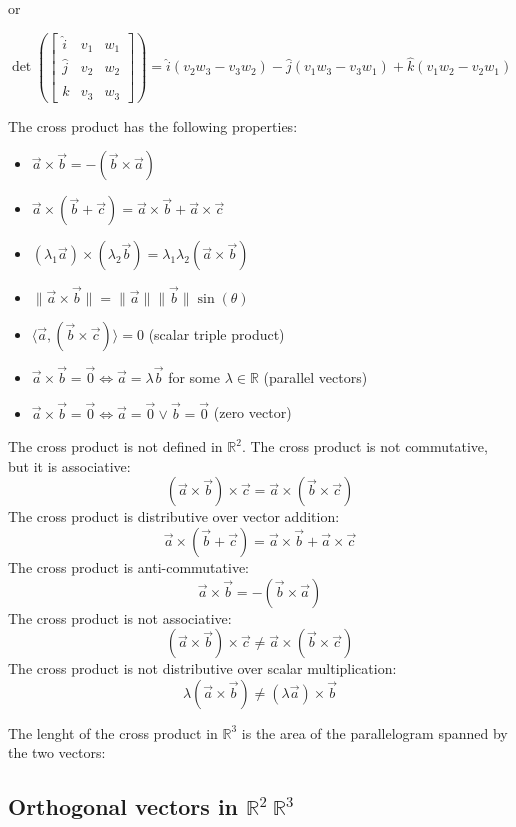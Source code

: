 or 

\[
\det\left( \begin{bmatrix}
	\hat{i} & v_1 & w_1 \\
	\hat{j} & v_2 & w_2 \\
	\hat{k} & v_3 & w_3
\end{bmatrix} \right)
= \hat{i}(v_2 w_3 - v_3 w_2) - \hat{j}(v_1 w_3 - v_3 w_1) + \hat{k}(v_1 w_2 - v_2 w_1)
\]


 The cross product has the following properties:
\begin{itemize}[label=\(-\)]
	\item \(\vec{a} \times \vec{b} = -(\vec{b} \times \vec{a})\)
	\item \(\vec{a} \times (\vec{b} + \vec{c}) = \vec{a} \times \vec{b} + \vec{a} \times \vec{c}\)
	\item \((\lambda_1\vec{a}) \times (\lambda_2\vec{b}) = \lambda_1\lambda_2(\vec{a} \times \vec{b})\)
	\item \(\|\vec{a} \times \vec{b}\| = \|\vec{a}\|\|\vec{b}\| \sin(\theta)\)
	\item \(\langle\vec{a}, (\vec{b} \times \vec{c})\rangle = 0\) (scalar triple product)
	\item \(\vec{a} \times \vec{b} = \vec{0} \Leftrightarrow \vec{a} = \lambda\vec{b}\) for some \(\lambda \in \mathbb{R}\) (parallel vectors)
	\item \(\vec{a} \times \vec{b} = \vec{0} \Leftrightarrow \vec{a} = \vec{0} \vee \vec{b} = \vec{0}\) (zero vector)
\end{itemize}
 The cross product is not defined in \(\mathbb{R}^2\).
 The cross product is not commutative, but it is associative:
\[
	(\vec{a} \times \vec{b}) \times \vec{c} = \vec{a} \times (\vec{b} \times \vec{c})
\]
 The cross product is distributive over vector addition:
\[
	\vec{a} \times (\vec{b} + \vec{c}) = \vec{a} \times \vec{b} + \vec{a} \times \vec{c}
\]
 The cross product is anti-commutative:
\[
	\vec{a} \times \vec{b} = -(\vec{b} \times \vec{a})
\]
 The cross product is not associative:
\[
	(\vec{a} \times \vec{b}) \times \vec{c} \neq \vec{a} \times (\vec{b} \times \vec{c})
\]
 The cross product is not distributive over scalar multiplication:
\[
	\lambda(\vec{a} \times \vec{b}) \neq (\lambda\vec{a}) \times \vec{b}
\]

 The lenght of the cross product in \(\mathbb{R}^3\) is the area of the parallelogram spanned by the two vectors:

\subsection{Orthogonal vectors in \texorpdfstring{\(\mathbb{R}^2\ \mathbb{R}^3\)}{}}

